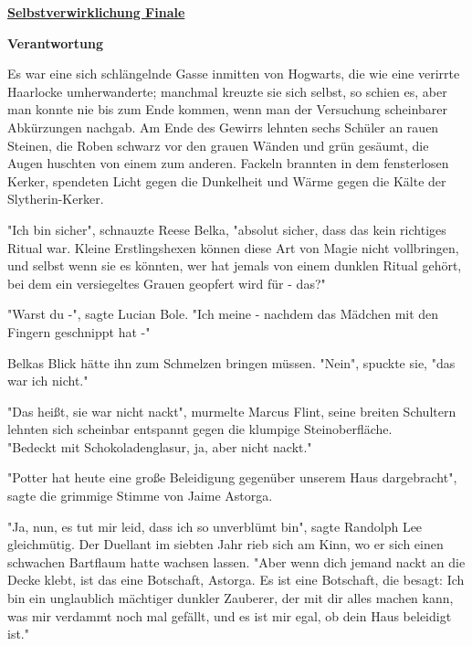 

\hypertarget{selbstverwirklichung-finale}{%

\textbf{\uline{Selbstverwirklichung Finale}}

\textbf{Verantwortung}

Es war eine sich schlängelnde Gasse inmitten von Hogwarts, die wie eine verirrte Haarlocke umherwanderte; manchmal kreuzte sie sich selbst, so schien es, aber man konnte nie bis zum Ende kommen, wenn man der Versuchung scheinbarer Abkürzungen nachgab. Am Ende des Gewirrs lehnten sechs Schüler an rauen Steinen, die Roben schwarz vor den grauen Wänden und grün gesäumt, die Augen huschten von einem zum anderen. Fackeln brannten in dem fensterlosen Kerker, spendeten Licht gegen die Dunkelheit und Wärme gegen die Kälte der Slytherin-Kerker.

"Ich bin sicher", schnauzte Reese Belka, "absolut sicher, dass das kein richtiges Ritual war. Kleine Erstlingshexen können diese Art von Magie nicht vollbringen, und selbst wenn sie es könnten, wer hat jemals von einem dunklen Ritual gehört, bei dem ein versiegeltes Grauen geopfert wird für - das?"

"Warst du -", sagte Lucian Bole. "Ich meine - nachdem das Mädchen mit den Fingern geschnippt hat -"

Belkas Blick hätte ihn zum Schmelzen bringen müssen. "Nein", spuckte sie, "das war ich nicht."

"Das heißt, sie war nicht nackt", murmelte Marcus Flint, seine breiten Schultern lehnten sich scheinbar entspannt gegen die klumpige Steinoberfläche.\\ "Bedeckt mit Schokoladenglasur, ja, aber nicht nackt."

"Potter hat heute eine große Beleidigung gegenüber unserem Haus dargebracht", sagte die grimmige Stimme von Jaime Astorga.

"Ja, nun, es tut mir leid, dass ich so unverblümt bin", sagte Randolph Lee gleichmütig. Der Duellant im siebten Jahr rieb sich am Kinn, wo er sich einen schwachen Bartflaum hatte wachsen lassen. "Aber wenn dich jemand nackt an die Decke klebt, ist das eine Botschaft, Astorga. Es ist eine Botschaft, die besagt: Ich bin ein unglaublich mächtiger dunkler Zauberer, der mit dir alles machen kann, was mir verdammt noch mal gefällt, und es ist mir egal, ob dein Haus beleidigt ist."

}

